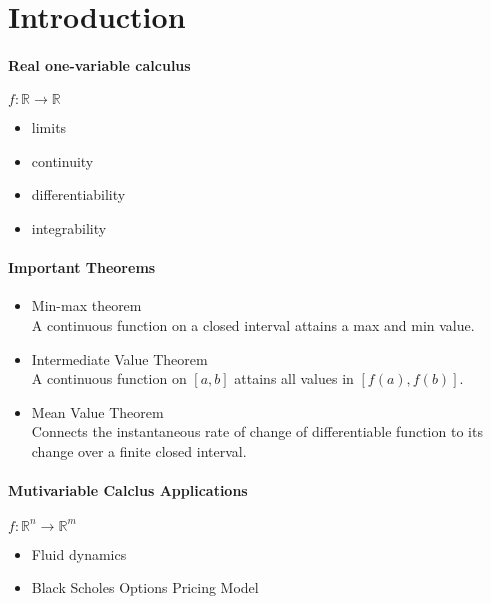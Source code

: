 
\section{Introduction}

\paragraph{Real one-variable calculus} \(f: \mathbb{R} \rightarrow \mathbb{R}\)
\begin{itemize}
    \item limits
    \item continuity
    \item differentiability
    \item integrability 
\end{itemize}

\paragraph{Important Theorems}
\begin{itemize}
    \item Min-max theorem \\
    A continuous function on a closed interval attains a max and min value.
    \item Intermediate Value Theorem \\
    A continuous function on \([a,b]\) attains all values in \([f(a), f(b)]\).
    \item Mean Value Theorem \\
    Connects the instantaneous rate of change of differentiable function to its change over
    a finite closed interval.
\end{itemize}

\paragraph{Mutivariable Calclus Applications} \(f: \mathbb{R}^n \rightarrow \mathbb{R}^m\)
\begin{itemize}
    \item Fluid dynamics
    \item Black Scholes Options Pricing Model
\end{itemize}